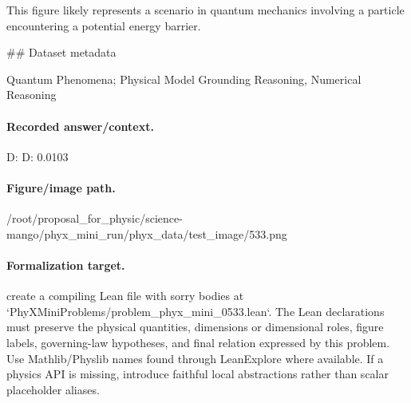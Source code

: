 This figure likely represents a scenario in quantum mechanics involving a particle encountering a potential energy barrier.

\#\# Dataset metadata

Quantum Phenomena; Physical Model Grounding Reasoning, Numerical Reasoning

\paragraph{Recorded answer/context.}
D: D: 0.0103

\paragraph{Figure/image path.}
/root/proposal\_for\_physic/science-mango/phyx\_mini\_run/phyx\_data/test\_image/533.png

\paragraph{Formalization target.}
create a compiling Lean file with sorry bodies at `PhyXMiniProblems/problem\_phyx\_mini\_0533.lean`. The Lean declarations must preserve the physical quantities, dimensions or dimensional roles, figure labels, governing-law hypotheses, and final relation expressed by this problem.
Use Mathlib/Physlib names found through LeanExplore where available. If a physics API is missing, introduce faithful local abstractions rather than scalar placeholder aliases.

